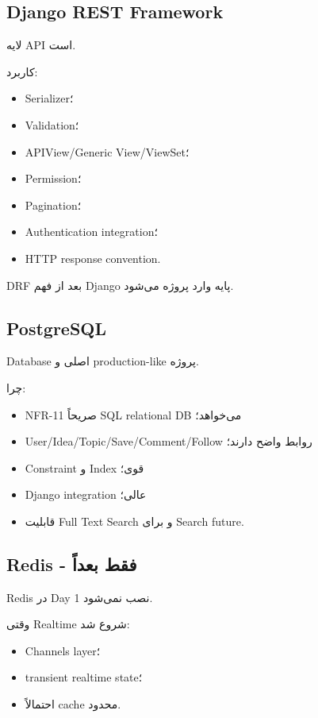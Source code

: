 \subsection{Django REST Framework}

 لایه API است.

کاربرد:
\begin{itemize}
  \item Serializer؛
  \item Validation؛
  \item APIView/Generic View/ViewSet؛
  \item Permission؛
  \item Pagination؛
  \item Authentication integration؛
  \item HTTP response convention.
\end{itemize}

DRF بعد از فهم Django پایه وارد پروژه می‌شود.

\subsection{PostgreSQL}

Database اصلی و production-like پروژه.

چرا:
\begin{itemize}
  \item NFR-11 صریحاً SQL relational DB می‌خواهد؛
  \item User/Idea/Topic/Save/Comment/Follow روابط واضح دارند؛
  \item Constraint و Index قوی؛
  \item Django integration عالی؛
  \item قابلیت Full Text Search و  برای Search future.
\end{itemize}

\subsection{Redis - فقط بعداً}

Redis در Day 1 نصب نمی‌شود.

وقتی Realtime شروع شد:
\begin{itemize}
  \item Channels layer؛
  \item transient realtime state؛
  \item احتمالاً cache محدود.
\end{itemize}

